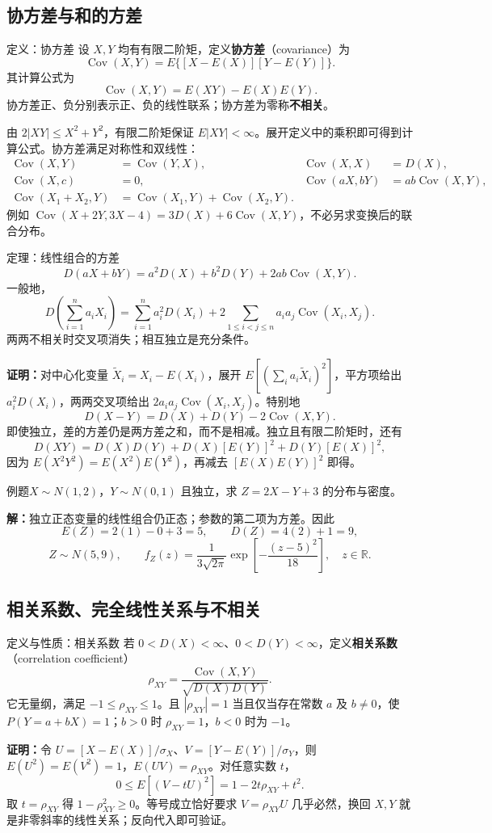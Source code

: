 \documentclass[UTF8,fontset=none,zihao=-4,a4paper]{ctexart}
\newcommand{\term}[1]{\textbf{#1}}
\newcommand{\example}[1]{\begin{infobox}{例题}#1\end{infobox}}
\newcommand{\solution}{\par\noindent\textbf{解：}}
\newcommand{\proof}{\par\noindent\textbf{证明：}}
\begin{document}
\subsection{协方差与和的方差}
\begin{infobox}{定义：协方差}
设 $X,Y$ 均有有限二阶矩，定义\term{协方差}（covariance）为
\[
\operatorname{Cov}(X,Y)=E\{[X-E(X)][Y-E(Y)]\}.
\]
其计算公式为
\[
\operatorname{Cov}(X,Y)=E(XY)-E(X)E(Y).
\]
协方差正、负分别表示正、负的线性联系；协方差为零称\term{不相关}。
\end{infobox}
由 $2|XY|\le X^2+Y^2$，有限二阶矩保证 $E|XY|<\infty$。展开定义中的乘积即可得到计算公式。协方差满足对称性和双线性：
\begin{align*}
\operatorname{Cov}(X,Y)&=\operatorname{Cov}(Y,X),&
\operatorname{Cov}(X,X)&=D(X),\\
\operatorname{Cov}(X,c)&=0,&
\operatorname{Cov}(aX,bY)&=ab\operatorname{Cov}(X,Y),\\
\operatorname{Cov}(X_1+X_2,Y)&=\operatorname{Cov}(X_1,Y)+\operatorname{Cov}(X_2,Y).
\end{align*}
例如 $\operatorname{Cov}(X+2Y,3X-4)=3D(X)+6\operatorname{Cov}(X,Y)$，不必另求变换后的联合分布。
\begin{infobox}{定理：线性组合的方差}
\[
D(aX+bY)=a^2D(X)+b^2D(Y)+2ab\operatorname{Cov}(X,Y).
\]
一般地，
\[
D\left(\sum_{i=1}^n a_iX_i\right)
=\sum_{i=1}^n a_i^2D(X_i)
+2\sum_{1\le i<j\le n}a_ia_j\operatorname{Cov}(X_i,X_j).
\]
两两不相关时交叉项消失；相互独立是充分条件。
\end{infobox}
\proof 对中心化变量 $\widetilde X_i=X_i-E(X_i)$，展开 $E[(\sum_i a_i\widetilde X_i)^2]$，平方项给出 $a_i^2D(X_i)$，两两交叉项给出 $2a_ia_j\operatorname{Cov}(X_i,X_j)$。特别地
\[
D(X-Y)=D(X)+D(Y)-2\operatorname{Cov}(X,Y).
\]
即使独立，差的方差仍是两方差之和，而不是相减。独立且有限二阶矩时，还有
\[
D(XY)=D(X)D(Y)+D(X)[E(Y)]^2+D(Y)[E(X)]^2,
\]
因为 $E(X^2Y^2)=E(X^2)E(Y^2)$，再减去 $[E(X)E(Y)]^2$ 即得。
\example{$X\sim N(1,2)$，$Y\sim N(0,1)$ 且独立，求 $Z=2X-Y+3$ 的分布与密度。}
\solution 独立正态变量的线性组合仍正态；参数的第二项为方差。因此
\[
E(Z)=2(1)-0+3=5,\qquad D(Z)=4(2)+1=9,
\]
\[
Z\sim N(5,9),\qquad f_Z(z)=\frac1{3\sqrt{2\pi}}
\exp\left[-\frac{(z-5)^2}{18}\right],\quad z\in\mathbb R.
\]

\subsection{相关系数、完全线性关系与不相关}
\begin{infobox}{定义与性质：相关系数}
若 $0<D(X)<\infty$、$0<D(Y)<\infty$，定义\term{相关系数}（correlation coefficient）
\[
\rho_{XY}=\frac{\operatorname{Cov}(X,Y)}{\sqrt{D(X)D(Y)}}.
\]
它无量纲，满足 $-1\le\rho_{XY}\le1$。且 $|\rho_{XY}|=1$ 当且仅当存在常数 $a$ 及 $b\ne0$，使 $P(Y=a+bX)=1$；$b>0$ 时 $\rho_{XY}=1$，$b<0$ 时为 $-1$。
\end{infobox}
\proof 令 $U=[X-E(X)]/\sigma_X$、$V=[Y-E(Y)]/\sigma_Y$，则 $E(U^2)=E(V^2)=1$，$E(UV)=\rho_{XY}$。对任意实数 $t$，
\[
0\le E[(V-tU)^2]=1-2t\rho_{XY}+t^2.
\]
取 $t=\rho_{XY}$ 得 $1-\rho_{XY}^2\ge0$。等号成立恰好要求 $V=\rho_{XY}U$ 几乎必然，换回 $X,Y$ 就是非零斜率的线性关系；反向代入即可验证。
\end{document}
